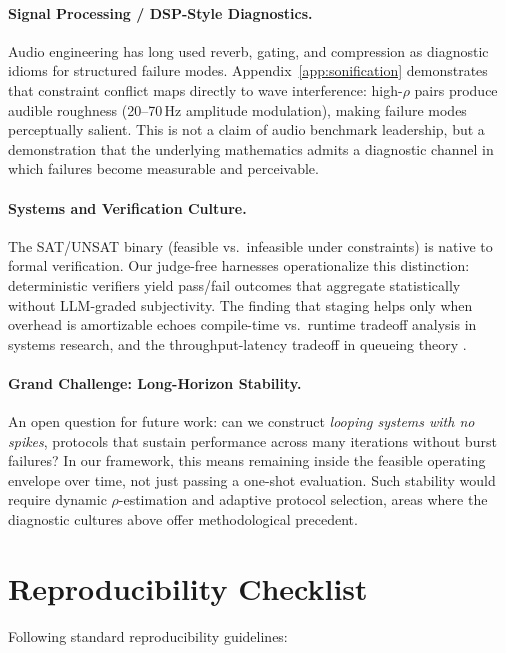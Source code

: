 \documentclass{article}
\theoremstyle{plain}
\theoremstyle{definition}
\theoremstyle{remark}
\begin{document}
\paragraph{Signal Processing / DSP-Style Diagnostics.}
Audio engineering has long used reverb, gating, and compression as diagnostic idioms for structured failure modes. Appendix~\ref{app:sonification} demonstrates that constraint conflict maps directly to wave interference: high-$\rho$ pairs produce audible roughness (20--70\,Hz amplitude modulation), making failure modes perceptually salient. This is not a claim of audio benchmark leadership, but a demonstration that the underlying mathematics admits a diagnostic channel in which failures become measurable and perceivable.

\paragraph{Systems and Verification Culture.}
The SAT/UNSAT binary (feasible vs.\ infeasible under constraints) is native to formal verification. Our judge-free harnesses operationalize this distinction: deterministic verifiers yield pass/fail outcomes that aggregate statistically without LLM-graded subjectivity. The finding that staging helps only when overhead is amortizable echoes compile-time vs.\ runtime tradeoff analysis in systems research, and the throughput-latency tradeoff in queueing theory \citep{little1961proof}.

\paragraph{Grand Challenge: Long-Horizon Stability.}
An open question for future work: can we construct \emph{looping systems with no spikes}, protocols that sustain performance across many iterations without burst failures? In our framework, this means remaining inside the feasible operating envelope over time, not just passing a one-shot evaluation. Such stability would require dynamic $\rho$-estimation and adaptive protocol selection, areas where the diagnostic cultures above offer methodological precedent.

\section{Reproducibility Checklist}\label{app:reproducibility}

Following standard reproducibility guidelines:
\end{document}
